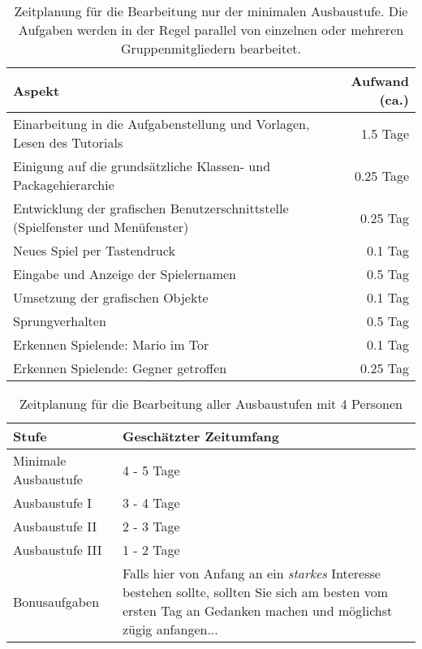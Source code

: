 \begin{table}[htb]
\begin{center}\begin{tabular}{|p{}|r|}\hline
\textbf{Aspekt} & \textbf{Aufwand (ca.)}\\\hline\hline

Einarbeitung in die Aufgabenstellung und Vorlagen, Lesen des Tutorials & 1.5 Tage\\\hline

Einigung auf die grunds\"atzliche Klassen- und Packagehierarchie & 0.25 Tage\\\hline

Entwicklung der grafischen Benutzerschnittstelle (Spielfenster und Menüfenster) & 0.25 Tag\\\hline

Neues Spiel per Tastendruck & 0.1 Tag\\\hline

Eingabe und Anzeige der Spielernamen & 0.5 Tag\\\hline

Umsetzung der grafischen Objekte & 0.1 Tag\\\hline

Sprungverhalten & 0.5 Tag \\\hline

Erkennen Spielende: Mario im Tor  & 0.1 Tag\\\hline

Erkennen Spielende: Gegner getroffen & 0.25 Tag \\\hline
\end{tabular}
\caption{Zeitplanung f\"ur die Bearbeitung \glqq{}nur\grqq{} der minimalen Ausbaustufe.
Die Aufgaben werden in der Regel parallel von einzelnen oder mehreren Gruppenmitgliedern bearbeitet.}
\label{tab:zeitplanMinimal}
\end{center}
\end{table}

\begin{table}[htb]
\begin{center}
\begin{tabular}{|p{}|p{}|}\hline
\textbf{Stufe} & \textbf{Gesch\"atzter Zeitumfang}\\\hline\hline
   Minimale Ausbaustufe & 4 - 5 Tage \\\hline

   Ausbaustufe I & 3 - 4 Tage \\\hline

   Ausbaustufe II & 2 - 3 Tage \\\hline

   Ausbaustufe III & 1 - 2 Tage \\\hline

   Bonusaufgaben & Falls hier von Anfang an ein \emph{starkes} Interesse bestehen
   sollte, sollten Sie sich am besten vom ersten Tag an Gedanken machen und m\"oglichst z\"ugig anfangen...\\\hline
\end{tabular}
\caption{Zeitplanung f\"ur die Bearbeitung aller Ausbaustufen mit 4 Personen}
\label{tab:zeitplanAlles}
\end{center}
\end{table}

